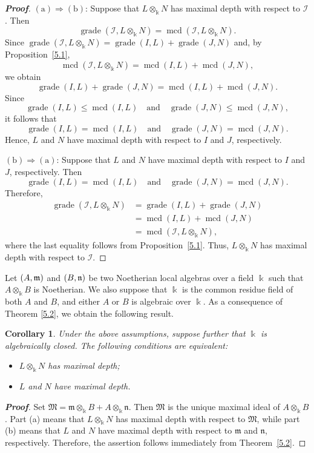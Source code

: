 \documentclass[10pt,a4paper]{amsart}
\numberwithin{equation}{theorem}
\newtheorem{corollary}[theorem]{Corollary}
\theoremstyle{definition}
\theoremstyle{fact}
\theoremstyle{conjecture}
\newcommand{\grade}{\operatorname{grade}}
\newcommand{\mcd}{\operatorname{mcd}}
\newcommand{\fm}{\frak{m}}
\newcommand{\fn}{\frak{n}}
\newenvironment{prf}[1][Proof]{\begin{proof}[\bf #1]}{\end{proof}}
\begin{document}
\begin{prf}
$(\mathrm{a})\Rightarrow(\mathrm{b})$: Suppose that $L\otimes_{\Bbbk} N$ has maximal depth with respect to $\mathcal{I}$. Then
\[
\grade(\mathcal{I},L\otimes_\Bbbk N)
=
\mcd(\mathcal{I},L\otimes_\Bbbk N).
\]
Since
$
\grade(\mathcal{I},L\otimes_\Bbbk N)
=
\grade(I,L)+\grade(J,N)
$
and, by Proposition~\ref{5.1},
\[
\mcd(\mathcal{I},L\otimes_\Bbbk N)
=
\mcd(I,L)+\mcd(J,N),
\]
we obtain
\[
\grade(I,L)+\grade(J,N)
=
\mcd(I,L)+\mcd(J,N).
\]
Since
\[
\grade(I,L)\leq\mcd(I,L)
\quad\text{and}\quad
\grade(J,N)\leq\mcd(J,N),
\]
it follows that
\[
\grade(I,L)=\mcd(I,L)
\quad\text{and}\quad
\grade(J,N)=\mcd(J,N).
\]
Hence, $L$ and $N$ have maximal depth with respect to $I$ and $J$, respectively.

$(\mathrm{b})\Rightarrow(\mathrm{a})$: Suppose that $L$ and $N$ have maximal depth with respect to $I$ and $J$, respectively. Then
\[
\grade(I,L)=\mcd(I,L)
\quad\text{and}\quad
\grade(J,N)=\mcd(J,N).
\]
Therefore,
\[
\begin{aligned}
\grade(\mathcal{I},L\otimes_\Bbbk N)
&=\grade(I,L)+\grade(J,N)\\
&=\mcd(I,L)+\mcd(J,N)\\
&=\mcd(\mathcal{I},L\otimes_\Bbbk N),
\end{aligned}
\]
where the last equality follows from Proposition~\ref{5.1}. Thus,
$L\otimes_\Bbbk N$ has maximal depth with respect to $\mathcal{I}$.
\end{prf}

Let $(A, \fm)$ and $(B, \fn)$ be two Noetherian local algebras over a field $\Bbbk$ such that $A \otimes_\Bbbk B$ is Noetherian.  We also suppose
that $\Bbbk$ is the common residue field of both $A$ and $B$, and either $A$ or $B$ is algebraic over $\Bbbk$.
As a consequence of Theorem \ref{5.2}, we obtain the following result.
\begin{corollary}
\label{5.3}
Under the above assumptions, suppose further that $\Bbbk$ is algebraically closed. The following conditions are equivalent:
\begin{itemize}
\item[(a)] $L\otimes_{\Bbbk} N$ has maximal depth;
\item[(b)] $L$ and $N$ have maximal depth.
\end{itemize}
\end{corollary}

\begin{prf}
Set
$
\mathfrak{M}=\mathfrak{m}\otimes_{\Bbbk} B
+A\otimes_{\Bbbk}\mathfrak{n}.
$
Then \(\mathfrak{M}\) is the unique maximal ideal of
\(A\otimes_{\Bbbk}B\).
Part (a) means that \(L\otimes_{\Bbbk}N\) has maximal depth
with respect to \(\mathfrak{M}\), while part (b) means that
\(L\) and \(N\) have maximal depth with respect to
\(\mathfrak{m}\) and \(\mathfrak{n}\), respectively.
Therefore, the assertion follows immediately from
Theorem~\ref{5.2}.
\end{prf}
\end{document}

